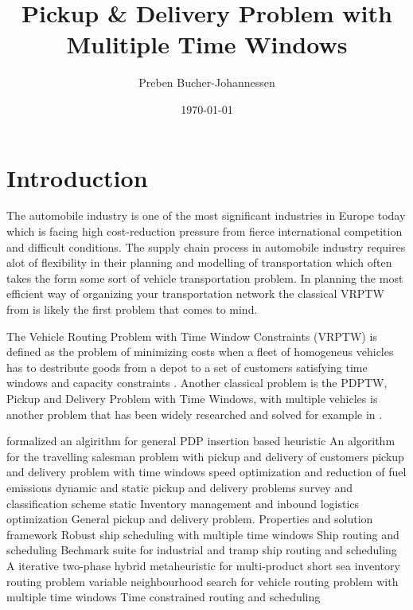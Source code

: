 \documentclass[a4paper,12pt]{article}
\begin{document}
\title{Pickup \& Delivery Problem with Mulitiple Time Windows}
\author{Preben Bucher-Johannessen}
\date{\today}
\maketitle

\tableofcontents
\newpage
{}

\section{Introduction}
The automobile industry is one of the most significant industries in Europe today which is facing high cost-reduction pressure from fierce international competition and difficult conditions.\cite{4flowWeb}
The supply chain process in automobile industry requires alot of flexibility in their planning and modelling of transportation which often takes the form some sort of vehicle transportation problem.
In planning the most efficient way of organizing your transportation network the classical VRPTW from is likely the first problem that comes to mind.

\cite{parragh08}
The Vehicle Routing Problem with Time Window Constraints (VRPTW) is defined as the problem of minimizing costs when a fleet of homogeneus vehicles has to destribute goods from a depot to a set of customers satisfying time windows and capacity constraints \cite{cordeau00}. 
Another classical problem is the PDPTW, Pickup and Delivery Problem with Time Windows, with multiple vehicles is another problem that has been widely researched and solved for example in \cite{nanry00}. 
\par
\cite{solomon87} formalized an algirithm for general PDP
\cite{lu06} insertion based heuristic
\cite{kalantari85} An algorithm for the travelling salesman problem with pickup and delivery of customers
\cite{dumas91} pickup and delivery problem with time windows
\cite{fagerholt10} speed optimization and reduction of fuel emissions
\cite{berbeglia10} dynamic and static pickup and delivery problems survey and classification scheme \cite{berbeglia07} static
\cite{zhou13} Inventory management and inbound logistics optimization
\cite{savelsbergh95} General pickup and delivery problem.
\cite{dror89} Properties and solution framework
\cite{christiansen02} Robust ship scheduling with multiple time windows
\cite{christiansen04} Ship routing and scheduling 
\cite{hemmati14} Bechmark suite for industrial and tramp ship routing and scheduling
\cite{hemmati16} A iterative two-phase hybrid metaheuristic for multi-product short sea inventory routing problem
\cite{ferreira18} variable neighbourhood search for vehicle routing problem with multiple time windows
\cite{desrosiers95} Time constrained routing and scheduling
\end{document}
